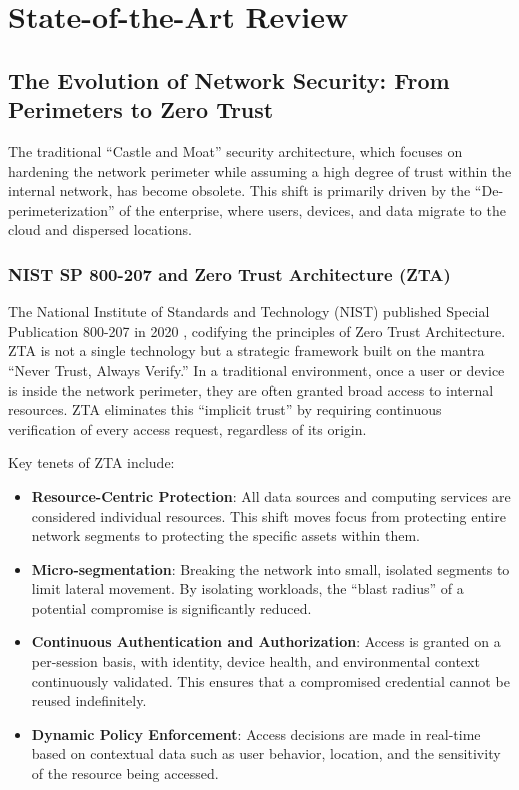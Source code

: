 \documentclass[12pt,a4paper]{article}
\begin{document}
\newpage

\section{State-of-the-Art Review}
\label{sec:sota}

\subsection{The Evolution of Network Security: From Perimeters to Zero Trust}
The traditional ``Castle and Moat'' security architecture, which focuses on hardening the network perimeter while assuming a high degree of trust within the internal network, has become obsolete. This shift is primarily driven by the ``De-perimeterization'' of the enterprise, where users, devices, and data migrate to the cloud and dispersed locations.

\subsubsection{NIST SP 800-207 and Zero Trust Architecture (ZTA)}
The National Institute of Standards and Technology (NIST) published Special Publication 800-207 in 2020 \cite{nist2020ztna}, codifying the principles of Zero Trust Architecture. ZTA is not a single technology but a strategic framework built on the mantra ``Never Trust, Always Verify.'' In a traditional environment, once a user or device is inside the network perimeter, they are often granted broad access to internal resources. ZTA eliminates this ``implicit trust'' by requiring continuous verification of every access request, regardless of its origin.

Key tenets of ZTA include:
\begin{itemize}
    \item \textbf{Resource-Centric Protection}: All data sources and computing services are considered individual resources. This shift moves focus from protecting entire network segments to protecting the specific assets within them.
    \item \textbf{Micro-segmentation}: Breaking the network into small, isolated segments to limit lateral movement. By isolating workloads, the ``blast radius'' of a potential compromise is significantly reduced.
    \item \textbf{Continuous Authentication and Authorization}: Access is granted on a per-session basis, with identity, device health, and environmental context continuously validated. This ensures that a compromised credential cannot be reused indefinitely.
    \item \textbf{Dynamic Policy Enforcement}: Access decisions are made in real-time based on contextual data such as user behavior, location, and the sensitivity of the resource being accessed.
\end{itemize}
\end{document}
